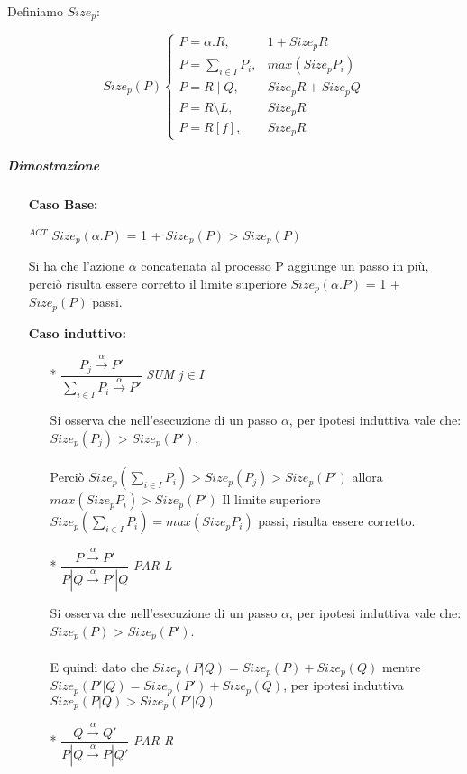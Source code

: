 Definiamo $Size_{p}$:

\[
Size_{p}(P)
\begin{cases}
P=\alpha.R,     & 1+Size_{p}{R}                \\
P=\displaystyle\sum_{i\in I}^{}P_{i},          & max(Size_{p}{P_{i}}) \\
P=R\mid Q,      & Size_{p}{R}+Size_{p}{Q}       \\
P=R\setminus L, & Size_{p}{R}                  \\
P=R[f],         & Size_{p}{R}
\end{cases}
\]

\subparagraph{Dimostrazione} \mbox{}

\begin{itemize}
	\item[] \textbf{Caso Base:} \mbox{}
	
	
	$^{ACT}$ \hspace{1cm} $Size_{p}(\alpha.P)$ = 1 + $Size_{p}(P)$ > $Size_{p}(P)$
	
	Si ha che l'azione $\alpha$ concatenata al processo P aggiunge un passo in più, perciò risulta essere corretto il limite superiore $Size_{p}(\alpha.P)$ = 1 + $Size_{p}(P)$ passi.
	\\
	\item[] \textbf{Caso induttivo:} \mbox{}
	\\
	\begin{itemize}
		
		\item[*]
			$\dfrac{P_{j} \overset{\alpha}\rightarrow P'}{\displaystyle\sum_{i\in I}^{}P_{i} \overset{\alpha}\rightarrow P'}$ \textit{SUM} $j\in I$                         
		
		Si osserva che nell'esecuzione di un passo $\alpha$, per ipotesi induttiva vale che: $Size_{p}(P_{j})$ > $Size_{p}(P')$. \\
		\\
		Perciò $Size_{p}(\displaystyle\sum_{i\in I}^{}P_{i}) > Size_{p}(P_{j}) > Size_{p}(P') $ allora $ max(Size_{p}{P_{i}}) > Size_{p}(P')$
		Il limite superiore  $ Size_{p}(\displaystyle\sum_{i\in I}^{}P_{i}) = max(Size_{p}{P_{i}})$ passi, risulta essere corretto.
		\\
		\item[*]
				$\dfrac{P \overset{\alpha}\rightarrow P'}{P|Q \overset{\alpha}\rightarrow P'|Q}$ \textit{PAR-L}  
				
				Si osserva che nell'esecuzione di un passo $\alpha$, per ipotesi induttiva vale che: $Size_{p}(P)$ > $Size_{p}(P')$. \\
				\\
				E quindi dato che $Size_{p}(P|Q) = Size_{p}(P) + Size_{p}(Q)$ mentre $  Size_{p}(P'|Q) = Size_{p}(P') + Size_{p}(Q)$, per ipotesi induttiva $Size_{p}(P|Q) > Size_{p}(P'|Q) $
				\\
		\item[*]
			$\dfrac{Q \overset{\alpha}\rightarrow Q'}{P|Q \overset{\alpha}\rightarrow P|Q'}$ \textit{PAR-R}  
			

\end{itemize}
\end{itemize}
